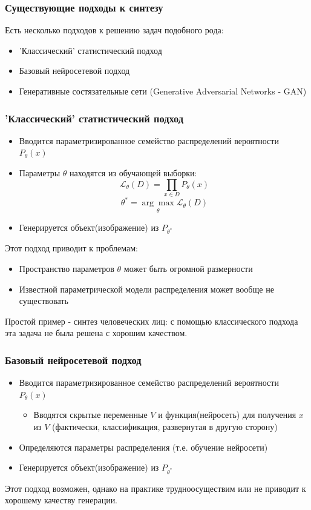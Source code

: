 \documentclass[9pt]{beamer}
\begin{document}
\begin{frame}\frametitle{Существующие подходы к синтезу}
	Есть несколько подходов к решению задач подобного рода:
	\begin{itemize}
		\item 'Классический' статистический подход
		\item Базовый нейросетевой подход
		\item Генеративные состязательные сети (Generative Adversarial Networks - GAN)
	\end{itemize}
\end{frame}

\begin{frame}\frametitle{'Классический' статистический подход}
	\begin{itemize}
		\item Вводится параметризированное семейство распределений вероятности $P_{\theta}(x)$
		\item Параметры $\theta$ находятся из обучающей выборки:
		$$ \mathcal{L}_{\theta}(D) = \prod_{x \in D} P_{\theta}(x) $$
		$$ \theta^{*} = \underset{\theta}{\arg\max} \mathcal{L}_{\theta}(D)$$
		\item Генерируется объект(изображение) из $ P_{\theta^{*}}$
	\end{itemize}
	Этот подход приводит к проблемам:
	\begin{itemize}
		\item Пространство параметров $\theta$ может быть огромной размерности
		\item Известной параметрической модели распределения может вообще не существовать
	\end{itemize}
	Простой пример - синтез человеческих лиц: с помощью классического подхода эта задача не была решена с хорошим качеством.
\end{frame}

\begin{frame}\frametitle{Базовый нейросетевой подход}
	\begin{itemize}
		\item Вводится параметризированное семейство распределений вероятности $P_{\theta}(x)$
		\begin{itemize}
			\item Вводятся скрытые переменные $V$ и функция(нейросеть) для получения $x$ из $V$ (фактически, классификация, развернутая в другую сторону)
		\end{itemize}
		\item Определяются параметры распределения (т.е. обучение нейросети)
		\item Генерируется объект(изображение) из $ P_{\theta^{*}}$
	\end{itemize}
	Этот подход возможен, однако на практике трудноосуществим или не приводит к хорошему качеству генерации.
\end{frame}
\end{document}
